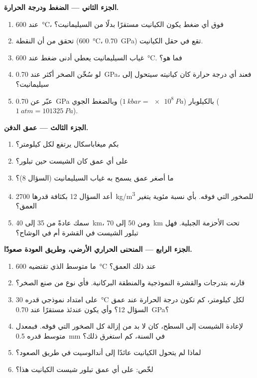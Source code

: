 \begin{problem}
\medskip
\noindent\textbf{الجزء الثاني --- الضغط ودرجة الحرارة.}
\begin{enumerate}[resume]
  \item عند \qty{600}{\celsius}، فوق أي ضغط يكون الكيانيت مستقرًا بدلًا
        من السيليمانيت؟
  \item تحقق من أن النقطة (\qty{600}{\celsius}، \qty{0.70}{GPa}) تقع في
        حقل الكيانيت.
  \item غياب السيليمانيت يعطي أدنى ضغط عند
        \qty{600}{\celsius}. فما هو؟
  \item لو سُخّن الصخر أكثر عند \qty{0.70}{GPa}، فعند أي
        درجة حرارة كان كيانيته سيتحول إلى سيليمانيت؟
  \item عبّر عن \qty{0.70}{GPa} بالكيلوبار ($\qty{1}{kbar} =
        \qty{e8}{Pa}$) وبالضغط الجوي ($\qty{1}{atm} = \qty{101325}{Pa}$).
\end{enumerate}

\medskip
\noindent\textbf{الجزء الثالث --- عمق الدفن.}
\begin{enumerate}[resume]
  \item بكم ميغاباسكال يرتفع  لكل
        كيلومتر؟
  \item على أي عمق كان الشيست حين تبلور؟
  \item ما أصغر عمق يسمح به غياب السيليمانيت
        (السؤال 8)؟
  \item أعد السؤال 12 بكثافة قدرها \qty{2700}{kg/m^3} للصخور
        التي فوقه. بأي نسبة مئوية يتغير العمق؟
  \item سمك  عادةً من 35 إلى \qty{40}{km}، ومن 50 إلى
        \qty{70}{km} تحت الأحزمة الجبلية. فهل تبلور الشيست في
        القشرة أم في الوشاح؟
\end{enumerate}

\medskip
\noindent\textbf{الجزء الرابع --- المنحنى الحراري الأرضي، وطريق العودة صعودًا.}
\begin{enumerate}[resume]
  \item ما متوسط  الذي تقتضيه \qty{600}{\celsius} عند ذلك
        العمق؟
  \item قارنه بتدرجات  والقشرة
        النموذجية والمنطقة البركانية. فأي نوع من  صنع الصخر؟
  \item على امتداد  نموذجي قدره \qty{30}{\celsius} لكل كيلومتر، كم
        تكون درجة الحرارة عند عمق السؤال 12؟ وأي
         يكون عندئذ مستقرًا عند \qty{0.70}{GPa}؟
  \item لإعادة الشيست إلى السطح، كان لا بد من إزالة كل الصخور التي فوقه.
        فبمعدل متوسط قدره \qty{0.5}{mm} في السنة، كم استغرق
        ذلك؟
  \item لماذا لم يتحول الكيانيت عائدًا إلى أندالوسيت في طريق الصعود؟
  \item لخّص: على أي عمق تبلور شيست الكيانيت هذا؟
\end{enumerate}
\end{problem}
